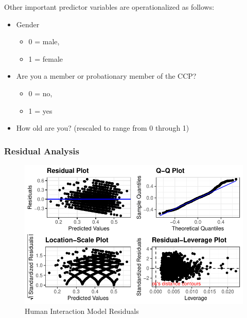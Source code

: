 \documentclass[]{interact}
\theoremstyle{plain}%
\theoremstyle{definition}
\theoremstyle{remark}
\begin{document}
Other important predictor variables are operationalized as follows:

\begin{itemize}
\item
  Gender

  \begin{itemize}
  \item
    0 = male,
  \item
    1 = female
  \end{itemize}
\item
  Are you a member or probationary member of the CCP?

  \begin{itemize}
  \item
    0 = no,
  \item
    1 = yes
  \end{itemize}
\item
  How old are you? (rescaled to range from 0 through 1)
\end{itemize}

\newpage{}

\hypertarget{residual-analysis}{%
\subsubsection{Residual Analysis}\label{residual-analysis}}

\begin{figure}

{\centering \includegraphics{Social-Isolation-in-China_files/figure-pdf/fig-resids-human-1.pdf}

}

\caption{\label{fig-resids-human}Human Interaction Model Residuals}

\end{figure}
\end{document}
